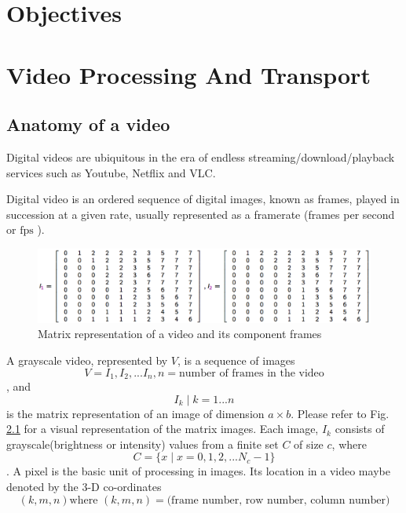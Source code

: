 \documentclass[letterpaper,12pt,titlepage,oneside,final]{report}
\newcommand{\mtext}[1]{
    $\text{#1}$
}
\begin{document}
        

\chapter{Objectives}
    \label{chap:objs}
    

\chapter{Video Processing And Transport}
    
    \section{Anatomy of a video}
        Digital videos are ubiquitous in the era of endless streaming/download/playback services such as Youtube, Netflix and VLC.
        
        Digital video is an ordered sequence of digital images, known as frames, played in succession at a given rate, usually represented as a framerate (frames per second or\mtext{fps}). 
        
        \begin{figure}[!h]
            \centering
            \includegraphics[width=\textwidth]{vidarch}
            \caption{Matrix representation of a video and its component frames}
            \label{vidarch}
        \end{figure}
        
        A grayscale video, represented by $V$, is a sequence of images $$ V = I_1, I_2, ... I_n, n = \text{number of frames in the video}$$, and $$I_k \mid k=1...n$$ is the matrix representation of an image of dimension $a \times b$. Please refer to Fig. \ref{vidarch} for a visual representation of the matrix images. Each image, $I_k$ consists of grayscale(brightness or intensity) values from a finite set $C$ of size $c$, where $$C = \{x \mid x = 0, 1, 2, ...N_c -1\}$$. A pixel is the basic unit of processing in images. Its location in a video maybe denoted by the 3-D co-ordinates 
        $$(k, m, n) \text{where } (k, m, n) = \text{(frame number, row number, column number)}$$
        
\end{document}
